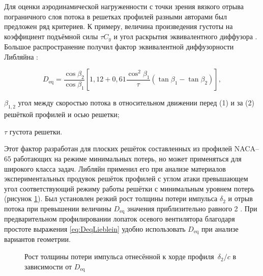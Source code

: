 Для оценки аэродинамической нагруженности с точки зрения вязкого отрыва пограничного слоя потока в решетках профилей разными авторами был предложен ряд критериев. К примеру, величина произведения густоты на коэффициент подъёмной силы $\tau C_y$ \cite{Hausenblas1963,Dovjik1968} и угол раскрытия эквивалентного диффузора \cite{Dovjik1958,Uschakov1963}. Большое распространение получил фактор эквивалентной диффузорности Либляйна \cite{Lieblein1959}:

\begin{equation}
	D_\text{eq} = \frac{\cos \beta_2}{\cos \beta_1} \left[ 1,12 + 0,61\frac{\cos^2\beta_1}{\tau}(\tan \beta_1 - \tan\beta_2) \right],
	\label{eq:DeqLieblein}
\end{equation}

\begin{eqexpl}
	\item{$\beta_{1,2}$} угол между скоростью потока в относительном движении перед (1) и за (2) решёткой профилей и осью решетки;
	\item{$\tau$} густота решетки.
\end{eqexpl}

Этот фактор разработан для плоских решёток составленных из профилей NACA–65 работающих на режиме минимальных потерь, но может применяться для широкого класса задач. Либляйн применил его при анализе материалов экспериментальных продувок решёток профилей с углом атаки превышающем угол соответствующий режиму работы решётки с минимальным уровнем потерь (рисунок \ref{fig:DeqLieblein}). Был установлен резкий рост толщины потери импульса $\delta_2$ и отрыв потока при превышении величины $D_\text{eq}$ значения приблизительно равного 2 \cite{Lieblein1959}. При предварительном профилировании лопаток осевого вентилятора благодаря простоте выражения \ref{eq:DeqLieblein} удобно использовать $D_\text{eq}$ при анализе вариантов геометрии.

\begin{figure}[ht]
	
	\caption{Рост толщины потери импульса отнесённой к хорде профиля~$\delta_2/c$ в зависимости от $D_\text{eq}$ \cite{Lieblein1959}}
	\label{fig:DeqLieblein}
\end{figure}

